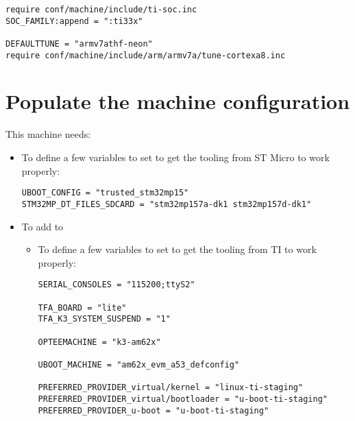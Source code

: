 \begin{verbatim}
require conf/machine/include/ti-soc.inc
SOC_FAMILY:append = ":ti33x"

DEFAULTTUNE = "armv7athf-neon"
require conf/machine/include/arm/armv7a/tune-cortexa8.inc
\end{verbatim}
  \fi
\fi
\section{Populate the machine configuration}

This  machine needs:

\if{}
\begin{itemize}
  \item To define a few variables to set to get the tooling from ST
    Micro to work properly:
\begin{verbatim}
UBOOT_CONFIG = "trusted_stm32mp15"
STM32MP_DT_FILES_SDCARD = "stm32mp157a-dk1 stm32mp157d-dk1"
\end{verbatim}
  \item To add  to 
\else
  \if{}
\begin{itemize}
  \item To define a few variables to set to get the tooling from TI
   to work properly:
\begin{verbatim}
SERIAL_CONSOLES = "115200;ttyS2"

TFA_BOARD = "lite"
TFA_K3_SYSTEM_SUSPEND = "1"

OPTEEMACHINE = "k3-am62x"

UBOOT_MACHINE = "am62x_evm_a53_defconfig"

PREFERRED_PROVIDER_virtual/kernel = "linux-ti-staging"
PREFERRED_PROVIDER_virtual/bootloader = "u-boot-ti-staging"
PREFERRED_PROVIDER_u-boot = "u-boot-ti-staging"


\end{verbatim}
\end{itemize}
\end{itemize}
